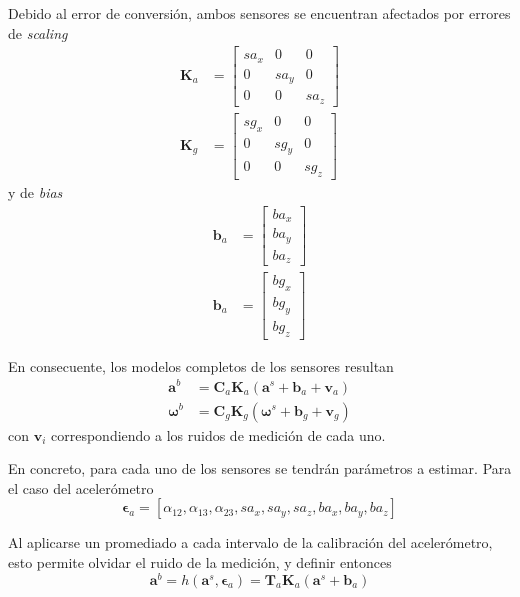 Debido al error de conversión, ambos sensores se encuentran afectados por errores de \textit{scaling}
\begin{align}
    \bm{K}_a &=
    \begin{bmatrix}
        sa_x & 0 & 0 \\
        0 & sa_y & 0 \\
        0 & 0 & sa_z
    \end{bmatrix}
    \\
    \bm{K}_g &=
    \begin{bmatrix}
        sg_x & 0 & 0 \\
        0 & sg_y & 0 \\
        0 & 0 & sg_z
    \end{bmatrix}
\end{align}
 y de \textit{bias}
 \begin{align}
    \bm{b}_a &=
    \begin{bmatrix}
        ba_x \\
        ba_y \\
        ba_z
    \end{bmatrix}
    \\
     \bm{b}_a &=
     \begin{bmatrix}
        bg_x \\
        bg_y \\
        bg_z
     \end{bmatrix}
\end{align}

En consecuente, los modelos completos de los sensores resultan
\begin{align}
    \bm{a}^b &= \bm{C}_a\bm{K}_a\left(\bm{a}^s + \bm{b}_a + \bm{v}_a\right) \\
    \bm{\omega}^b &= \bm{C}_g\bm{K}_g\left(\bm{\omega}^s + \bm{b}_g + \bm{v}_g\right)
\end{align}
con $\bm{v}_i$ correspondiendo a los ruidos de medición de cada uno.

En concreto, para cada uno de los sensores se tendrán parámetros a estimar. Para el caso del acelerómetro
\begin{equation}
    \bm{\epsilon}_{a} = [\alpha_{12},\alpha_{13},\alpha_{23},sa_x,sa_y,sa_z,ba_x,ba_y,ba_z]
\end{equation}

Al aplicarse un promediado a cada intervalo de la calibración del acelerómetro, esto permite olvidar el ruido de la medición, y definir entonces
\begin{equation}
    \bm{a}^b = h(\bm{a}^s,\bm{\epsilon}_{a}) = \bm{T}_a\bm{K}_a(\bm{a}^s+\bm{b}_a)    
\end{equation}

